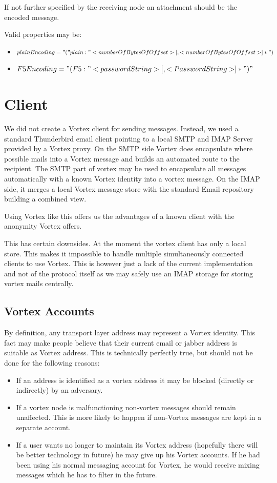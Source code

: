 If not further specified by the receiving node an attachment should be the encoded message. 

Valid properties may be:
\begin{itemize}
	\item $plainEncoding="("plain:"<numberOfBytesOfOffset>[,<numberOfBytesOfOffset>]*")$
	\item $F5Encoding="(F5:"<passwordString>[,<PasswordString>]*")"$
\end{itemize}

\section{Client}
We did not create a Vortex client for sending messages. Instead, we used a standard Thunderbird email client pointing to a local SMTP and IMAP Server provided by a Vortex proxy. On the SMTP side Vortex does encapsulate where possible mails into a Vortex message and builds an automated route to the recipient. The SMTP part of vortex may be used to encapsulate all messages automatically with a known Vortex identity into a vortex message. On the IMAP side, it merges a local Vortex message store with the standard Email repository building a combined view.

Using Vortex like this offers us the advantages of a known client with the anonymity Vortex offers.

This has certain downsides. At the moment the vortex client has only a local store. This makes it impossible to handle multiple simultaneously connected clients to use Vortex. This is however just a lack of the current implementation and not of the protocol itself as we may safely use an IMAP storage for storing vortex mails centrally.

\subsection{Vortex Accounts}
By definition, any transport layer address may represent a Vortex identity. This fact may make people believe that their current email or jabber address is suitable as Vortex address. This is technically perfectly true, but should not be done for the following reasons:

\begin{itemize}
	\item If an address is identified as a vortex address it may be blocked (directly or indirectly) by an adversary.
	\item If a vortex node is malfunctioning non-vortex messages should remain unaffected. This is more likely to happen if non-Vortex messages are kept in a separate account.
	\item If a user wants no longer to maintain its Vortex address (hopefully there will be better technology in future) he may give up his Vortex accounts. If he had been using his normal messaging account for Vortex, he would receive mixing messages which he has to filter in the future.
\end{itemize}

